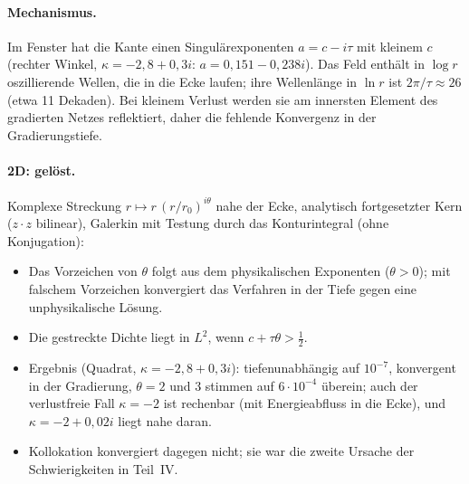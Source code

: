 \documentclass[11pt, a4paper]{article}
\theoremstyle{plain}
\theoremstyle{definition}
\begin{document}
\paragraph{Mechanismus.} Im Fenster hat die Kante einen Singulärexponenten $a=c-i\tau$ mit kleinem $c$
(rechter Winkel, $\kappa=-2{,}8+0{,}3i$: $a=0{,}151-0{,}238i$). Das Feld enthält in $\log r$ oszillierende
Wellen, die in die Ecke laufen; ihre Wellenlänge in $\ln r$ ist $2\pi/\tau\approx26$ (etwa 11 Dekaden). Bei
kleinem Verlust werden sie am innersten Element des gradierten Netzes reflektiert, daher die fehlende
Konvergenz in der Gradierungstiefe.

\paragraph{2D: gelöst.} Komplexe Streckung $r\mapsto r\,(r/r_0)^{i\theta}$ nahe der Ecke, analytisch
fortgesetzter Kern ($z\cdot z$ bilinear), Galerkin mit Testung durch das Konturintegral (ohne Konjugation):
\begin{itemize}[leftmargin=*]
  \item Das Vorzeichen von $\theta$ folgt aus dem physikalischen Exponenten ($\theta>0$); mit falschem
    Vorzeichen konvergiert das Verfahren in der Tiefe gegen eine unphysikalische Lösung.
  \item Die gestreckte Dichte liegt in $L^2$, wenn $c+\tau\theta>\tfrac12$.
  \item Ergebnis (Quadrat, $\kappa=-2{,}8+0{,}3i$): tiefenunabhängig auf $10^{-7}$, konvergent in der
    Gradierung, $\theta=2$ und $3$ stimmen auf $6\cdot10^{-4}$ überein; auch der verlustfreie Fall $\kappa=-2$ ist
    rechenbar (mit Energieabfluss in die Ecke), und $\kappa=-2+0{,}02i$ liegt nahe daran.
  \item Kollokation konvergiert dagegen nicht; sie war die zweite Ursache der Schwierigkeiten in Teil~IV.
\end{itemize}
\end{document}
